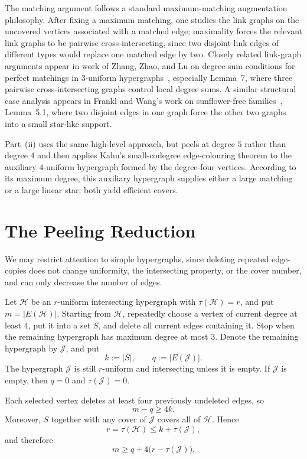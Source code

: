 \documentclass[11pt]{amsart}
\theoremstyle{remark}
\newcommand{\cH}{\mathcal H}
\newcommand{\cJ}{\mathcal J}
\newcommand{\ta}{\tau}
\begin{document}
The matching argument follows a standard maximum-matching augmentation
philosophy.  After fixing a maximum matching, one studies the link graphs on
the uncovered vertices associated with a matched edge; maximality forces the
relevant link graphs to be pairwise cross-intersecting, since two disjoint
link edges of different types would replace one matched edge by two.  Closely
related link-graph arguments appear in work of Zhang, Zhao, and Lu on
degree-sum conditions for perfect matchings in $3$-uniform
hypergraphs~\cite{ZZL}, especially Lemma~7, where three pairwise
cross-intersecting graphs control local degree sums.  A similar structural
case analysis appears in Frankl and Wang's work on sunflower-free
families~\cite{FranklWangSunflowers}, Lemma~5.1, where two disjoint edges in
one graph force the other two graphs into a small star-like support.

Part~(ii) uses the same high-level approach, but peels at degree $5$ rather
than degree $4$ and then applies Kahn's small-codegree edge-colouring theorem
to the auxiliary $4$-uniform hypergraph formed by the degree-four vertices.
According to its maximum degree, this auxiliary hypergraph supplies either a
large matching or a large linear star; both yield efficient covers.

\section{The Peeling Reduction}

We may restrict attention to simple hypergraphs, since deleting repeated
edge-copies does not change uniformity, the intersecting property, or the cover
number, and can only decrease the number of edges.

Let $\cH$ be an $r$-uniform intersecting hypergraph with $\ta(\cH)=r$, and put
$m=|E(\cH)|$.  Starting from $\cH$, repeatedly choose a vertex of current
degree at least $4$, put it into a set $S$, and delete all current edges
containing it.  Stop when the remaining hypergraph has maximum degree at most
$3$.  Denote the remaining hypergraph by $\cJ$, and put
\[
  k:=|S|,\qquad q:=|E(\cJ)|.
\]
The hypergraph $\cJ$ is still $r$-uniform and intersecting unless it is empty.
If $\cJ$ is empty, then $q=0$ and $\ta(\cJ)=0$.

Each selected vertex deletes at least four previously undeleted edges, so
\begin{equation}\label{eq:peeling-edge-count}
  m-q\ge 4k.
\end{equation}
Moreover, $S$ together with any cover of $\cJ$ covers all of $\cH$.  Hence
\[
  r=\ta(\cH)\le k+\ta(\cJ),
\]
and therefore
\begin{equation}\label{eq:peeling-lower}
  m\ge q+4\bigl(r-\ta(\cJ)\bigr).
\end{equation}
\end{document}
